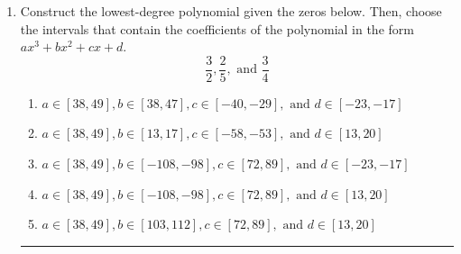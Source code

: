 \documentclass[14pt]{extbook}
\newcommand{\litem}[1]{\item#1\hspace*{-1cm}\rule{\textwidth}{0.4pt}}
\begin{document}
\begin{enumerate}
{\begin{enumerate}[label=\Alph*.]
\end{enumerate} }
\litem{
Construct the lowest-degree polynomial given the zeros below. Then, choose the intervals that contain the coefficients of the polynomial in the form $ax^3+bx^2+cx+d$.\[ \frac{3}{2}, \frac{2}{5}, \text{ and } \frac{3}{4} \]\begin{enumerate}[label=\Alph*.]
\item \( a \in [38, 49], b \in [38, 47], c \in [-40, -29], \text{ and } d \in [-23, -17] \)
\item \( a \in [38, 49], b \in [13, 17], c \in [-58, -53], \text{ and } d \in [13, 20] \)
\item \( a \in [38, 49], b \in [-108, -98], c \in [72, 89], \text{ and } d \in [-23, -17] \)
\item \( a \in [38, 49], b \in [-108, -98], c \in [72, 89], \text{ and } d \in [13, 20] \)
\item \( a \in [38, 49], b \in [103, 112], c \in [72, 89], \text{ and } d \in [13, 20] \)


\end{enumerate}}
\end{enumerate}
\end{document}
